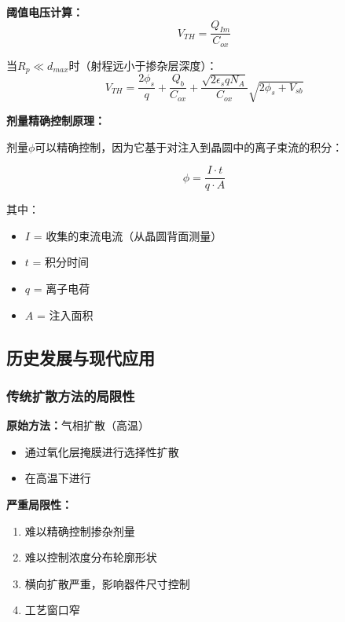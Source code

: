\documentclass[UTF8,12pt,a4paper]{ctexart}
\begin{document}
\textbf{阈值电压计算：}
\begin{equation}
V_{TH} = \frac{Q_{Im}}{C_{ox}}
\end{equation}

当$R_p \ll d_{max}$时（射程远小于掺杂层深度）：
\begin{equation}
V_{TH} = \frac{2\phi_s}{q} + \frac{Q_b}{C_{ox}} + \frac{\sqrt{2\epsilon_s q N_A}}{C_{ox}}\sqrt{2\phi_s + V_{sb}}
\end{equation}

\textbf{剂量精确控制原理：}

剂量$\phi$可以精确控制，因为它基于对注入到晶圆中的离子束流的积分：

\begin{equation}
\phi = \frac{I \cdot t}{q \cdot A}
\end{equation}

其中：
\begin{itemize}
    \item $I$ = 收集的束流电流（从晶圆背面测量）
    \item $t$ = 积分时间
    \item $q$ = 离子电荷
    \item $A$ = 注入面积
\end{itemize}

\subsection{历史发展与现代应用}

\subsubsection{传统扩散方法的局限性}

\textbf{原始方法：}气相扩散（高温）

\begin{itemize}
    \item 通过氧化层掩膜进行选择性扩散
    \item 在高温下进行
\end{itemize}

\textbf{严重局限性：}
\begin{enumerate}
    \item 难以精确控制掺杂剂量
    \item 难以控制浓度分布轮廓形状
    \item 横向扩散严重，影响器件尺寸控制
    \item 工艺窗口窄
\end{enumerate}
\end{document}
